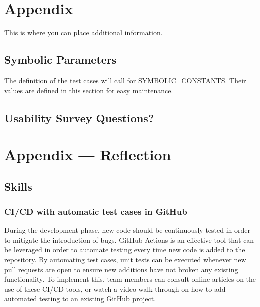 \documentclass[12pt, titlepage]{article}
\begin{document}
	
	
	
	
	
	
	\newpage
	
	\section{Appendix}
	
	This is where you can place additional information.
	
	\subsection{Symbolic Parameters}
	
	The definition of the test cases will call for SYMBOLIC\_CONSTANTS.
	Their values are defined in this section for easy maintenance.
	
	\subsection{Usability Survey Questions?}
	
	
	\newpage{}
	\section*{Appendix --- Reflection}
	
	\subsection*{Skills}
	\subsubsection{CI/CD with automatic test cases in GitHub}
	
	During the development phase, new code should be continuously tested in 
	order to mitigate the introduction of bugs. GitHub Actions is an effective 
	tool that can be leveraged in order to automate testing every time new 
	code is added to the repository. By automating test cases, unit tests can 
	be executed whenever new pull requests are open to ensure new additions 
	have not broken any existing functionality. To implement this, team members 
	can consult online articles on the use of these CI/CD tools, or watch a 
	video walk-through on how to add automated testing to an existing GitHub 
	project.
	
\end{document}
